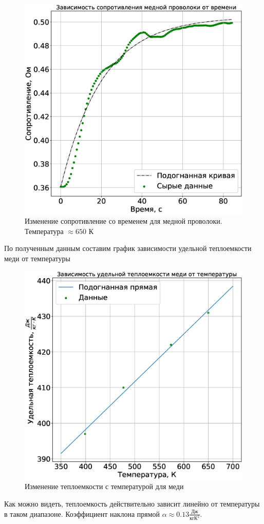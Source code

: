 \documentclass[a4paper,14pt]{extarticle}
\begin{document}
			\begin{figure}[h!]
				\centering
				\includegraphics[width=.60\linewidth]{Lab3_12.eps}
				\caption{Изменение сопротивление со временем для медной проволоки. Температура $\approx 650$ К}
				\label{fig9}
			\end{figure}
			\newpage
			
			По полученным данным составим график зависимости удельной теплоемкости меди от температуры
			\begin{figure}[h!]
				\centering
				\includegraphics[width=.60\linewidth]{Lab3_13.eps}
				\caption{Изменение теплоемкости с температурой для меди}
				\label{fig9}
			\end{figure}
			
			Как можно видеть, теплоемкость действительно зависит линейно от температуры в таком диапазоне. Коэффициент наклона прямой $\alpha \approx 0.13 \frac{\text{Дж}}{\text{кг} \text{К}^2}$.
\end{document}
